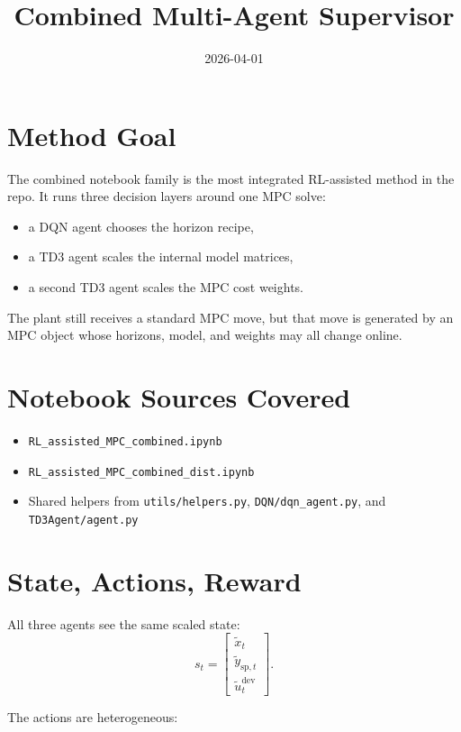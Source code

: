 \documentclass[11pt]{article}
\title{Combined Multi-Agent Supervisor}
\date{2026-04-01}
\begin{document}
\maketitle

\section*{Method Goal}

The combined notebook family is the most integrated RL-assisted method in the
repo. It runs three decision layers around one MPC solve:

\begin{itemize}
\item a DQN agent chooses the horizon recipe,
\item a TD3 agent scales the internal model matrices,
\item a second TD3 agent scales the MPC cost weights.
\end{itemize}

The plant still receives a standard MPC move, but that move is generated by an
MPC object whose horizons, model, and weights may all change online.

\section*{Notebook Sources Covered}

\begin{itemize}
\item \texttt{RL\_assisted\_MPC\_combined.ipynb}
\item \texttt{RL\_assisted\_MPC\_combined\_dist.ipynb}
\item Shared helpers from \texttt{utils/helpers.py},
      \texttt{DQN/dqn\_agent.py}, and \texttt{TD3Agent/agent.py}
\end{itemize}

\section*{State, Actions, Reward}

All three agents see the same scaled state:
\[
s_t =
\begin{bmatrix}
\tilde{x}_{t} \\
\tilde{y}_{\mathrm{sp},t} \\
\tilde{u}_{t}^{\mathrm{dev}}
\end{bmatrix}.
\]

The actions are heterogeneous:
\end{document}
